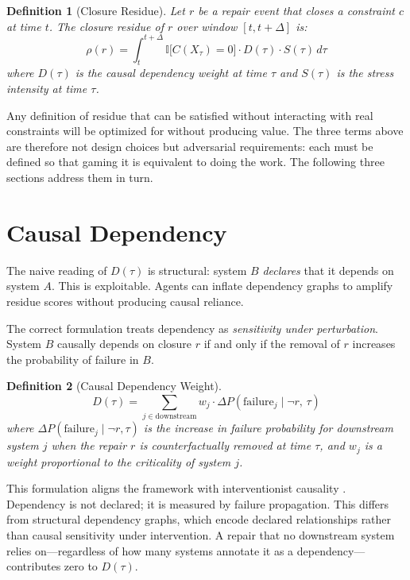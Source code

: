 \documentclass[12pt]{article}
\newtheorem{definition}{Definition}
\begin{document}
\begin{definition}[Closure Residue]
Let $r$ be a repair event that closes a constraint $c$ at time $t$.
The \emph{closure residue} of $r$ over window $[t, t+\Delta]$ is:
\[
  \rho(r) = \int_{t}^{t+\Delta}
    \mathbb{I}\bigl[C(X_\tau) = 0\bigr]
    \cdot D(\tau)
    \cdot S(\tau)
  \, d\tau
\]
where $D(\tau)$ is the causal dependency weight at time $\tau$ and
$S(\tau)$ is the stress intensity at time $\tau$.
\end{definition}

Any definition of residue that can be satisfied without interacting with
real constraints will be optimized for without producing value. The
three terms above are therefore not design choices but adversarial
requirements: each must be defined so that gaming it is equivalent to
doing the work. The following three sections address them in turn.

\section{Causal Dependency}

The naive reading of $D(\tau)$ is structural: system $B$ \emph{declares}
that it depends on system $A$. This is exploitable. Agents can inflate
dependency graphs to amplify residue scores without producing causal
reliance.

The correct formulation treats dependency as \emph{sensitivity under
perturbation}. System $B$ causally depends on closure $r$ if and only
if the removal of $r$ increases the probability of failure in $B$.

\begin{definition}[Causal Dependency Weight]
\[
  D(\tau) = \sum_{j \in \mathrm{downstream}}
    w_j \cdot \Delta P\!\left(\mathrm{failure}_j \mid \neg r,\, \tau\right)
\]
where $\Delta P(\mathrm{failure}_j \mid \neg r, \tau)$ is the increase
in failure probability for downstream system $j$ when the repair $r$ is
counterfactually removed at time $\tau$, and $w_j$ is a weight
proportional to the criticality of system $j$.
\end{definition}

This formulation aligns the framework with interventionist causality
\cite{pearl2009,spirtes2000}.
Dependency is not declared; it is measured by failure propagation. This
differs from structural dependency graphs, which encode declared
relationships rather than causal sensitivity under intervention. A
repair that no downstream system relies on---regardless of how many
systems annotate it as a dependency---contributes zero to $D(\tau)$.
\end{document}
